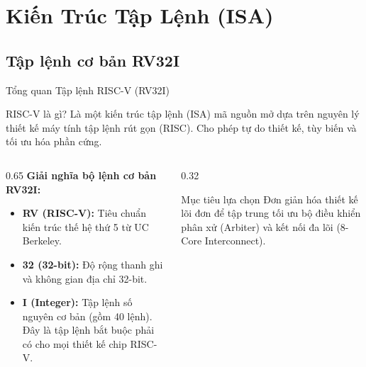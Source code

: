 \section{Kiến Trúc Tập Lệnh (ISA)}

\subsection{Tập lệnh cơ bản RV32I}
\begin{frame}{Tổng quan Tập lệnh RISC-V (RV32I)}
    \begin{block}{RISC-V là gì?}
        Là một kiến trúc tập lệnh (ISA) mã nguồn mở dựa trên nguyên lý thiết kế máy tính tập lệnh rút gọn (RISC). Cho phép tự do thiết kế, tùy biến và tối ưu hóa phần cứng.
    \end{block}
    
    \vspace{0.2cm}
    \begin{columns}
        \begin{column}{0.65\textwidth}
            \textbf{Giải nghĩa bộ lệnh cơ bản RV32I:}
            \begin{itemize}
                \item \textbf{RV (RISC-V):} Tiêu chuẩn kiến trúc thế hệ thứ 5 từ UC Berkeley.
                \item \textbf{32 (32-bit):} Độ rộng thanh ghi và không gian địa chỉ 32-bit.
                \item \textbf{I (Integer):} Tập lệnh số nguyên cơ bản (gồm 40 lệnh). Đây là tập lệnh bắt buộc phải có cho mọi thiết kế chip RISC-V.
            \end{itemize}
        \end{column}
        \begin{column}{0.32\textwidth}
            \begin{exampleblock}{Mục tiêu lựa chọn}
                Đơn giản hóa thiết kế lõi đơn để tập trung tối ưu bộ điều khiển phân xử (Arbiter) và kết nối đa lõi (8-Core Interconnect).
            \end{exampleblock}
        \end{column}
    \end{columns}
\end{frame}

